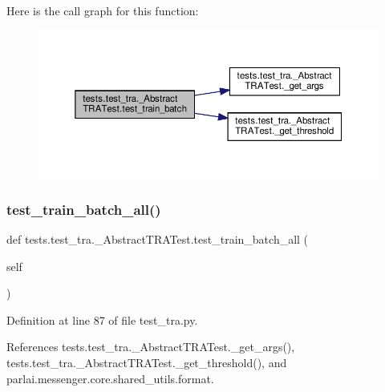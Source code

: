 Here is the call graph for this function\+:
\nopagebreak
\begin{figure}[H]
\begin{center}
\leavevmode
\includegraphics[width=350pt]{classtests_1_1test__tra_1_1__AbstractTRATest_a00c2874cb33f155fa829cc7783d5d724_cgraph}
\end{center}
\end{figure}
\mbox{\label{classtests_1_1test__tra_1_1__AbstractTRATest_a5e0358ae47540ed9b0583e75ac1d9a49}} 
\subsubsection{\texorpdfstring{test\+\_\+train\+\_\+batch\+\_\+all()}{test\_train\_batch\_all()}}
{\footnotesize\ttfamily def tests.\+test\+\_\+tra.\+\_\+\+Abstract\+T\+R\+A\+Test.\+test\+\_\+train\+\_\+batch\+\_\+all (\begin{DoxyParamCaption}\item[{}]{self }\end{DoxyParamCaption})}



Definition at line 87 of file test\+\_\+tra.\+py.



References tests.\+test\+\_\+tra.\+\_\+\+Abstract\+T\+R\+A\+Test.\+\_\+get\+\_\+args(), tests.\+test\+\_\+tra.\+\_\+\+Abstract\+T\+R\+A\+Test.\+\_\+get\+\_\+threshold(), and parlai.\+messenger.\+core.\+shared\+\_\+utils.\+format.

